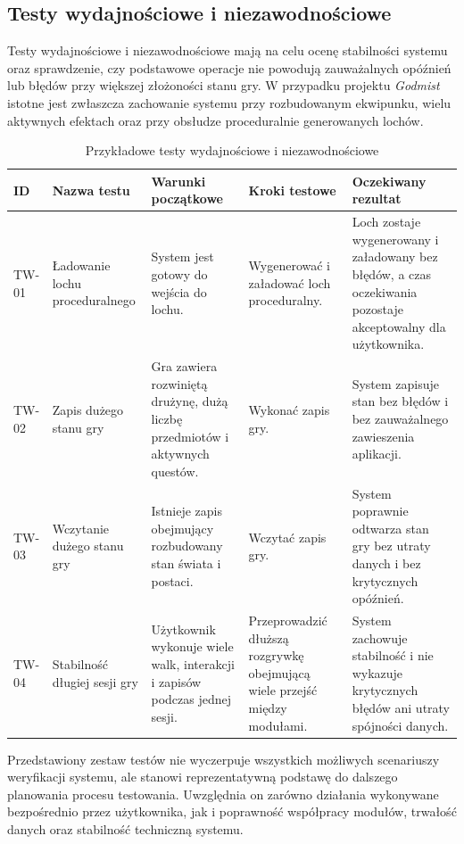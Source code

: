 \subsection{Testy wydajnościowe i niezawodnościowe}
\label{subsec:testy-wydajnosciowe}

Testy wydajnościowe i niezawodnościowe mają na celu ocenę stabilności systemu oraz sprawdzenie, czy podstawowe operacje nie powodują zauważalnych opóźnień lub błędów przy większej złożoności stanu gry. W przypadku projektu \emph{Godmist} istotne jest zwłaszcza zachowanie systemu przy rozbudowanym ekwipunku, wielu aktywnych efektach oraz przy obsłudze proceduralnie generowanych lochów.

\begin{table}[H]
\centering
\caption{Przykładowe testy wydajnościowe i niezawodnościowe}
\label{tab:testy-wydajnosciowe}
\begin{threeparttable}
\begin{tabularx}{\linewidth}{|p{1.6cm}|p{3.2cm}|X|X|X|}
\hline
\textbf{ID} & \textbf{Nazwa testu} & \textbf{Warunki początkowe} & \textbf{Kroki testowe} & \textbf{Oczekiwany rezultat} \\
\hline
TW-01 & Ładowanie lochu proceduralnego & System jest gotowy do wejścia do lochu. & Wygenerować i załadować loch proceduralny. & Loch zostaje wygenerowany i załadowany bez błędów, a czas oczekiwania pozostaje akceptowalny dla użytkownika. \\
\hline
TW-02 & Zapis dużego stanu gry & Gra zawiera rozwiniętą drużynę, dużą liczbę przedmiotów i aktywnych questów. & Wykonać zapis gry. & System zapisuje stan bez błędów i bez zauważalnego zawieszenia aplikacji. \\
\hline
TW-03 & Wczytanie dużego stanu gry & Istnieje zapis obejmujący rozbudowany stan świata i postaci. & Wczytać zapis gry. & System poprawnie odtwarza stan gry bez utraty danych i bez krytycznych opóźnień. \\
\hline
TW-04 & Stabilność długiej sesji gry & Użytkownik wykonuje wiele walk, interakcji i zapisów podczas jednej sesji. & Przeprowadzić dłuższą rozgrywkę obejmującą wiele przejść między modułami. & System zachowuje stabilność i nie wykazuje krytycznych błędów ani utraty spójności danych. \\
\hline
\end{tabularx}
\end{threeparttable}
\end{table}

Przedstawiony zestaw testów nie wyczerpuje wszystkich możliwych scenariuszy weryfikacji systemu, ale stanowi reprezentatywną podstawę do dalszego planowania procesu testowania. Uwzględnia on zarówno działania wykonywane bezpośrednio przez użytkownika, jak i poprawność współpracy modułów, trwałość danych oraz stabilność techniczną systemu.

